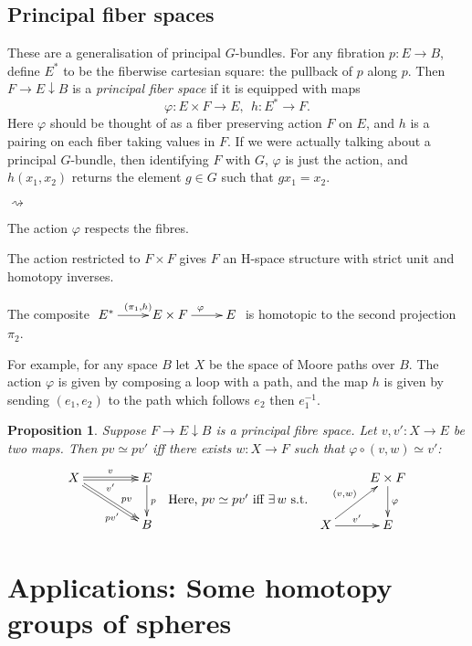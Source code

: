 \documentclass[11pt]{article}
\theoremstyle{plain}
\newtheorem*{prop*}{Proposition}
\theoremstyle{definition}
\renewcommand{\to}{\longrightarrow}
\newenvironment{itemise}{
\begin{list}{\textup{$\rightsquigarrow$}}
   {
      \setlength{\topsep}{.1cm}
      \setlength{\itemsep}{1pt}
      \setlength{\parskip}{0pt}
      \setlength{\parsep}{0pt}
   }
}{\end{list}\vspace{-.2cm}}
\begin{document}
\subsection{Principal fiber spaces}
These are a generalisation of principal $G$-bundles. For any fibration $p:E\to B$, define $E^*$ to be the fiberwise cartesian square: the pullback of $p$ along $p$. Then $F\rightarrow E\downarrow B$ is a \emph{principal fiber space} if it is equipped with maps 
\[\varphi:E\times F\to E,\ \ h:E^*\to F.\]
Here $\varphi$ should be thought of as a fiber preserving action $F$ on $E$, and $h$ is a pairing on each fiber taking values in $F$. If we were actually talking about a principal $G$-bundle, then identifying $F$ with $G$, $\varphi$ is just the action, and $h(x_1,x_2)$ returns the element $g\in G$ such that $gx_1=x_2$.
\begin{itemise}
\item The action $\varphi$ respects the fibres.
\item The action restricted to $F\times F$ gives $F$ an H-space structure with strict unit and homotopy inverses.
\item The composite $\xymatrix{E^*\ar[r]^{(\pi_1,h)}&E\times F\ar[r]^{\varphi}&E}$ is homotopic to the second projection $\pi_2$.
\end{itemise}
For example, for any space $B$ let $X$ be the space of Moore paths over $B$. The action $\varphi$ is given by composing a loop with a path, and the map $h$ is given by sending $(e_1,e_2)$ to the path which follows $e_2$ then $e_1^{-1}$.
\begin{prop*}
Suppose $F\rightarrow E\downarrow B$ is a principal fibre space. Let $v,v':X\to E$ be two maps. Then $pv\simeq pv'$ iff there exists $w:X\to F$ such that $\varphi\circ(v,w)\simeq v'$:
\[\xymatrix@C=1.5cm{
X\ar@<.25ex>[r]^v\ar@<-.25ex>[r]_{v'}\ar@<.25ex>[dr]^(.63){pv}\ar@<-.25ex>[rd]_(.63){pv'}&E\ar[d]^p\\
&B
}\raisebox{-.6cm}{ \ Here, $pv\simeq pv'$ iff $\exists\, w$ s.t.\ \ }
\xymatrix{
&E\times F\ar[d]^\varphi\\
X\ar[ur]^{(v,w)}\ar[r]^{v'}&E
}\]
\end{prop*}

\section{Applications: Some homotopy groups of spheres}
\setcounter{subsection}{1}
\end{document}
